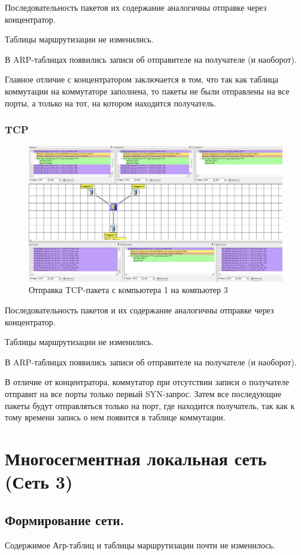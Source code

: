 \documentclass[12pt,onecolumn]{article}
\begin{document}
Последовательность пакетов их содержание аналогичны отправке через концентратор.

Таблицы маршрутизации не изменились.

В ARP-таблицах появились записи об отправителе на получателе (и наоборот).

Главное отличие с концентратором заключается в том, что так как таблица коммутации на коммутаторе заполнена, то пакеты не были отправлены на все порты, а только на тот, на котором находится получатель.

\subsubsection{TCP}
\begin{figure}[H]
  \centering
  \includegraphics[width=\textwidth]{image/part2/tcp.png}
  \caption{Отправка TCP-пакета с компьютера 1 на компьютер 3}
\end{figure}

Последовательность пакетов и их содержание аналогичны отправке через концентратор.

Таблицы маршрутизации не изменились.

В ARP-таблицах появились записи об отправителе на получателе (и наоборот).

В отличие от концентратора, коммутатор при отсутствии записи о получателе отправит на все порты только первый SYN-запрос. Затем все последующие пакеты будут отправляться только на порт, где находится получатель, так как к тому времени запись о нем появится в таблице коммутации.

\section{Многосегментная локальная сеть (Сеть 3)}
\subsection{Формирование сети.}
Содержимое Агр-таблиц и таблицы маршрутизации почти не изменилось.
\end{document}
